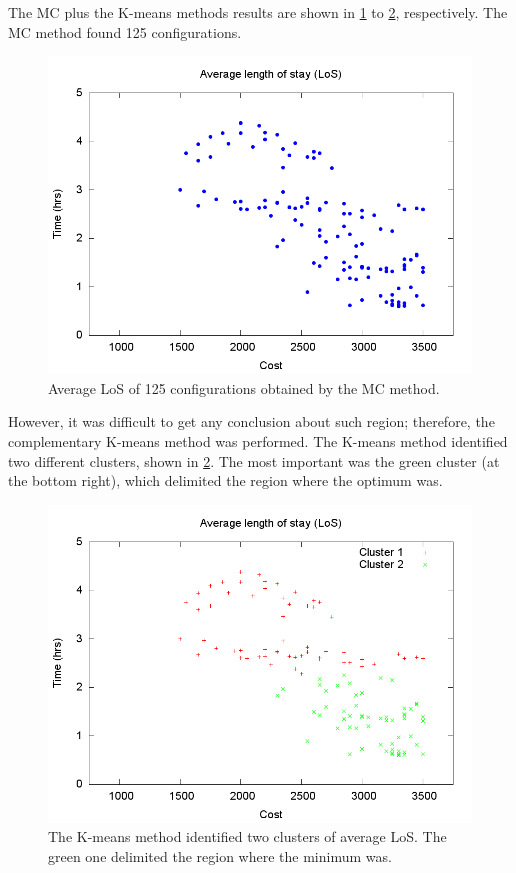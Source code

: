 The MC plus the K-means methods results are shown in \ref{subfig:mc8-1}
to \ref{subfig:km8-1}, respectively. The MC method found 125 configurations.
\begin{figure}[H]
\noindent \centering{}\includegraphics[width=0.95\columnwidth,height=0.25\paperheight]{figs4/v0/MC/MC-6400-602-50-69-25-125confs-LoS}\caption{Average LoS of 125 configurations obtained by the MC method. \label{subfig:mc8-1}}
\end{figure}
However, it was difficult to get any conclusion about such region;
therefore, the complementary K-means method was performed. The K-means
method identified two different clusters, shown in \ref{subfig:km8-1}.
The most important was the green cluster (at the bottom right), which
delimited the region where the optimum was.
\begin{figure}[H]
\noindent \centering{}\includegraphics[width=0.95\columnwidth,height=0.25\paperheight]{figs4/v0/MC/K-means-6400-602-50-69-25-125-Cluster1-58_Cluster2-58}\caption{The K-means method identified two clusters of average LoS. The green
one delimited the region where the minimum was.\label{subfig:km8-1}}
\end{figure}


